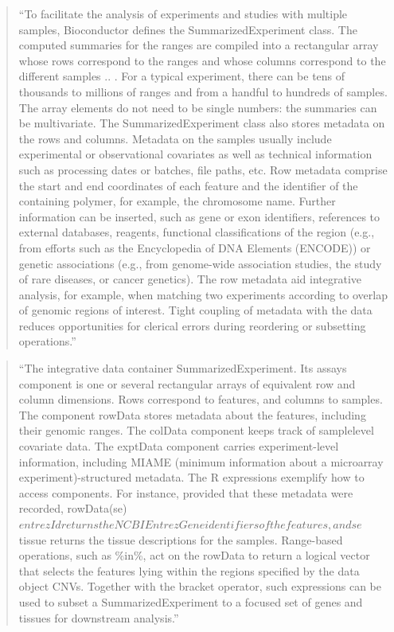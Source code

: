 \documentclass[]{tufte-book}
\begin{document}
\begin{quote}
``To facilitate the analysis of experiments and studies with multiple samples,
Bioconductor defines the SummarizedExperiment class. The computed summaries for
the ranges are compiled into a rectangular array whose rows correspond to the
ranges and whose columns correspond to the different samples .. . For a typical
experiment, there can be tens of thousands to millions of ranges and from a
handful to hundreds of samples. The array elements do not need to be single
numbers: the summaries can be multivariate. The SummarizedExperiment class also
stores metadata on the rows and columns. Metadata on the samples usually include
experimental or observational covariates as well as technical information such
as processing dates or batches, file paths, etc. Row metadata comprise the start
and end coordinates of each feature and the identifier of the containing
polymer, for example, the chromosome name. Further information can be inserted,
such as gene or exon identifiers, references to external databases, reagents,
functional classifications of the region (e.g., from efforts such as the
Encyclopedia of DNA Elements (ENCODE)) or genetic associations (e.g., from
genome-wide association studies, the study of rare diseases, or cancer
genetics). The row metadata aid integrative analysis, for example, when matching
two experiments according to overlap of genomic regions of interest. Tight
coupling of metadata with the data reduces opportunities for clerical errors
during reordering or subsetting operations.'' \citep{huber2015orchestrating}
\end{quote}

\begin{quote}
``The integrative data container SummarizedExperiment. Its assays component is
one or several rectangular arrays of equivalent row and column dimensions. Rows
correspond to features, and columns to samples. The component rowData stores
metadata about the features, including their genomic ranges. The colData
component keeps track of samplelevel covariate data. The exptData component
carries experiment-level information, including MIAME (minimum information about
a microarray experiment)-structured metadata. The R expressions exemplify how to
access components. For instance, provided that these metadata were recorded,
rowData(se)\(entrezId returns the NCBI Entrez Gene identifiers of the features, and se\)tissue returns the tissue descriptions for the samples. Range-based
operations, such as \%in\%, act on the rowData to return a logical vector that
selects the features lying within the regions specified by the data object CNVs.
Together with the bracket operator, such expressions can be used to subset a
SummarizedExperiment to a focused set of genes and tissues for downstream
analysis.'' \citep{huber2015orchestrating}
\end{quote}
\end{document}
